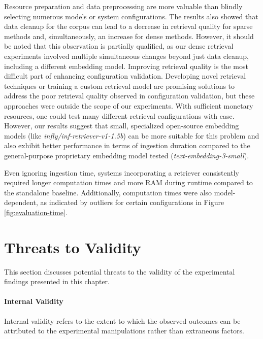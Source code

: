 Resource preparation and data preprocessing are more valuable than blindly selecting numerous models or system configurations. The results also showed that data cleanup for the corpus can lead to a decrease in retrieval quality for sparse methods and, simultaneously, an increase for dense methods. However, it should be noted that this observation is partially qualified, as our dense retrieval experiments involved multiple simultaneous changes beyond just data cleanup, including a different embedding model. Improving retrieval quality is the most difficult part of enhancing configuration validation. Developing novel retrieval techniques or training a custom retrieval model are promising solutions to address the poor retrieval quality observed in configuration validation, but these approaches were outside the scope of our experiments. With sufficient monetary resources, one could test many different retrieval configurations with ease. However, our results suggest that small, specialized open-source embedding models (like \textit{infly/inf-retriever-v1-1.5b}) can be more suitable for this problem and also exhibit better performance in terms of ingestion duration compared to the general-purpose proprietary embedding model tested (\textit{text-embedding-3-small}).

Even ignoring ingestion time, systems incorporating a retriever consistently required longer computation times and more RAM during runtime compared to the standalone baseline. Additionally, computation times were also model-dependent, as indicated by outliers for certain configurations in Figure \ref{fig:evaluation-time}.

\section{Threats to Validity} \label{sec:exp_threats}

This section discusses potential threats to the validity of the experimental findings presented in this chapter.

\paragraph{Internal Validity}
Internal validity refers to the extent to which the observed outcomes can be attributed to the experimental manipulations rather than extraneous factors.

